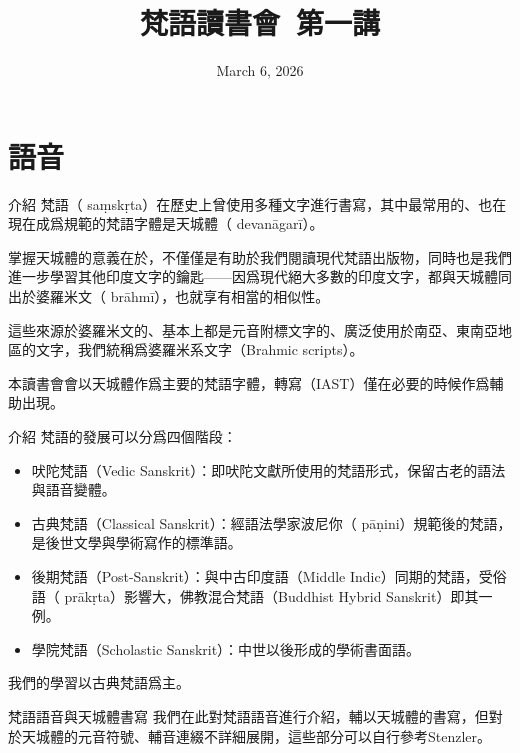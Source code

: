 \documentclass[aspectratio=169]{beamer}
\title{梵語讀書會~第一講}
\author{\texorpdfstring{\SA{आकाश याङ्ग}}{आकाश याङ्ग}}
\date{March 6, 2026}
\begin{document}
\begin{frame}[plain]
  \titlepage
\end{frame}

\section{語音}

\begin{frame}{介紹}
    梵語（ saṃskṛta）在歷史上曾使用多種文字進行書寫，其中最常用的、也在現在成爲規範的梵語字體是天城體（ devanāgarī）。

    掌握天城體的意義在於，不僅僅是有助於我們閱讀現代梵語出版物，同時也是我們進一步學習其他印度文字的鑰匙——因爲現代絕大多數的印度文字，都與天城體同出於婆羅米文（ brāhmī），也就享有相當的相似性。
    
    這些來源於婆羅米文的、基本上都是元音附標文字的、廣泛使用於南亞、東南亞地區的文字，我們統稱爲婆羅米系文字（Brahmic scripts）。

    本讀書會會以天城體作爲主要的梵語字體，轉寫（IAST）僅在必要的時候作爲輔助出現。
\end{frame}

\begin{frame}{介紹}
    梵語的發展可以分爲四個階段：
    \begin{itemize}
        \item 吠陀梵語（Vedic Sanskrit）：即吠陀文獻所使用的梵語形式，保留古老的語法與語音變體。
        \item 古典梵語（Classical Sanskrit）：經語法學家波尼你（ pāṇini）規範後的梵語，是後世文學與學術寫作的標準語。
        \item 後期梵語（Post-Sanskrit）：與中古印度語（Middle Indic）同期的梵語，受俗語（ prākṛta）影響大，佛教混合梵語（Buddhist Hybrid Sanskrit）即其一例。
        \item 學院梵語（Scholastic Sanskrit）：中世以後形成的學術書面語。
    \end{itemize}

    我們的學習以古典梵語爲主。
\end{frame}

\begin{frame}{梵語語音與天城體書寫}
    我們在此對梵語語音進行介紹，輔以天城體的書寫，但對於天城體的元音符號、輔音連綴不詳細展開，這些部分可以自行參考Stenzler。
\end{frame}
\end{document}
